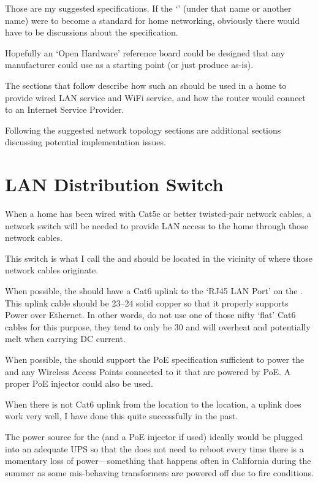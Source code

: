 Those are my suggested specifications. If the `' (under that name or another name) were to
become a standard for home networking, obviously there would have to be discussions about the specification.

Hopefully an `Open Hardware' reference board could be designed that any manufacturer could use as a starting point
(or just produce as-is).

The sections that follow describe how such an  should be used in a home to provide wired LAN
service and WiFi service, and how the router would connect to an Internet Service Provider.

Following the suggested network topology sections are additional sections discussing potential implementation issues.

\section{LAN Distribution Switch}

When a home has been wired with Cat5e or better twisted-pair network cables, a network switch will be needed to
provide LAN access to the home through those network cables.

This switch is what I call the  and should be located in the vicinity of where
those network cables originate.

When possible, the  should have a Cat6 uplink to the `RJ45 LAN Port' on the
. This uplink cable should be \qtyrange{23}{24}{\awg} solid copper so that it properly
supports Power over Ethernet. In other words, do not use one of those nifty `flat' Cat6 cables for this purpose,
they tend to only be \qty{30}{\awg} and will overheat and potentially melt when carrying DC current.

When possible, the  should support the PoE specification sufficient to
power the  and any Wireless Access Points connected to it that are powered by PoE. A proper
PoE injector could also be used.

When there is not Cat6 uplink from the  location to the 
location, a  uplink does work very well, I have done this quite successfully in the past.

The power source for the  (and a PoE injector if used) ideally would be plugged
into an adequate UPS so that the  does not need to reboot every time there is a
momentary loss of power---something that happens often in California during the summer as some mis-behaving
transformers are powered off due to fire conditions.

